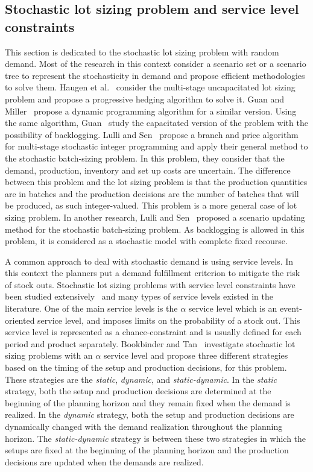 \documentclass[10pt]{article}
\begin{document}
\subsection{Stochastic lot sizing problem and service level constraints}
This section is dedicated to the stochastic lot sizing problem with random demand. Most of the research in this context consider a scenario set or a scenario tree to represent the stochasticity in demand and propose efficient methodologies to solve them. Haugen et al.~\cite{haugen2001progressive} consider the multi-stage uncapacitated lot sizing problem and propose a progressive hedging algorithm to solve it. Guan and Miller~\cite{guan2008polynomial} propose a dynamic programming algorithm for a similar version. Using the same algorithm, Guan~\cite{guan2011stochastic} study the capacitated version of the problem with the possibility of backlogging. Lulli and Sen~\cite{lulli2004branch} propose a branch and price algorithm for multi-stage stochastic integer programming and apply their general method to the stochastic batch-sizing problem. In this problem, they consider that the demand, production, inventory and set up costs are uncertain. The difference between this problem and the lot sizing problem is that the production quantities are in batches and the production decisions are the number of batches that will be produced, as such integer-valued. This problem is a more general case of lot sizing problem. In another research, Lulli and Sen~\cite{lulli2004branch}  proposed a scenario updating method for the stochastic batch-sizing problem. As backlogging is allowed in this problem, it is considered as a stochastic model with complete fixed recourse.  

A common approach to deal with stochastic demand is using service levels. In this context the planners put  a demand fulfillment criterion to mitigate the risk of stock outs.  Stochastic lot sizing problems with service level constraints have been studied extensively~\cite{tempelmeier2007stochastic} and many types of service levels existed in the literature. One of the main service levels is the $\alpha$ service level which is an event-oriented service level, and imposes limits on the probability of a stock out. This service level is represented as a chance-constraint and is usually defined for each period and product separately. Bookbinder and Tan~\cite{bookbinder1988strategies} investigate stochastic lot sizing problems with an $\alpha$ service level and propose three different strategies based on the timing of the setup and production decisions, for this problem. These strategies are the \textit{static}, \textit{dynamic}, and \textit{static-dynamic}. In the \textit{static} strategy, both the setup and production decisions are determined at the beginning of the planning horizon and they remain fixed when the demand is realized. In the \textit{dynamic} strategy, both the setup and production decisions are dynamically changed with the demand realization throughout the planning horizon. The \textit{static-dynamic} strategy is between these two strategies in which the setups are fixed at the beginning of the planning horizon and the production decisions are updated when the demands are realized. %
\end{document}
